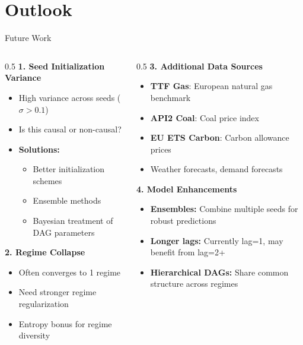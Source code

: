 \documentclass[aspectratio=169]{beamer}
\begin{document}
\section{Outlook}

\begin{frame}{Future Work}
\begin{columns}
\begin{column}{0.5\textwidth}
\textbf{1. Seed Initialization Variance}
\begin{itemize}
    \item High variance across seeds ($\sigma > 0.1$)
    \item Is this causal or non-causal?
    \item \textbf{Solutions:}
    \begin{itemize}
        \item Better initialization schemes
        \item Ensemble methods
        \item Bayesian treatment of DAG parameters
    \end{itemize}
\end{itemize}

\vspace{0.3cm}
\textbf{2. Regime Collapse}
\begin{itemize}
    \item Often converges to 1 regime
    \item Need stronger regime regularization
    \item Entropy bonus for regime diversity
\end{itemize}
\end{column}

\begin{column}{0.5\textwidth}
\textbf{3. Additional Data Sources}
\begin{itemize}
    \item \textbf{TTF Gas}: European natural gas benchmark
    \item \textbf{API2 Coal}: Coal price index
    \item \textbf{EU ETS Carbon}: Carbon allowance prices
    \item Weather forecasts, demand forecasts
\end{itemize}

\textbf{4. Model Enhancements}
\begin{itemize}
    \item \textbf{Ensembles:} Combine multiple seeds for robust predictions
    \item \textbf{Longer lags:} Currently lag=1, may benefit from lag=2+
    \item \textbf{Hierarchical DAGs:} Share common structure across regimes
\end{itemize}
\end{column}
\end{columns}
\end{frame}
\end{document}
